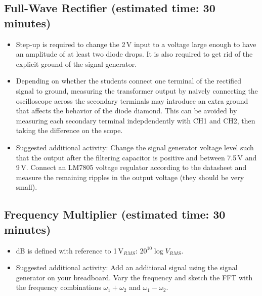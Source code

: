 \documentclass{article}
\begin{document}
\subsection{Full-Wave Rectifier (estimated time: 30 minutes)}
\begin{itemize}
\item Step-up is required to change the 2\,V input to a voltage large enough to have an amplitude of at least two diode drops.  It is also required to get rid of the explicit ground of the signal generator.
\item Depending on whether the students connect one terminal of the rectified signal to ground, measuring the transformer output by naively connecting the oscilloscope across the secondary terminals may introduce an extra ground that affects the behavior of the diode diamond.  This can be avoided by measuring each secondary terminal indepdendently with CH1 and CH2, then taking the difference on the scope.
\item Suggested additional activity: Change the signal generator voltage level such that the output after the filtering capacitor is positive and between 7.5\,V and 9\,V.  Connect an LM7805 voltage regulator according to the datasheet and measure the remaining ripples in the output voltage (they should be very small).
\end{itemize}

\subsection{Frequency Multiplier (estimated time: 30 minutes)}
\begin{itemize}
\item dB is defined with reference to 1\,V$_{RMS}$: $20 ^{10}\log V_{RMS}$.
\item Suggested additional activity: Add an additional signal using the signal generator on your breadboard.  Vary the frequency and sketch the FFT with the frequency combinations $\omega_1 + \omega_2$ and $\omega_1 - \omega_2$.
\end{itemize}
\end{document}
